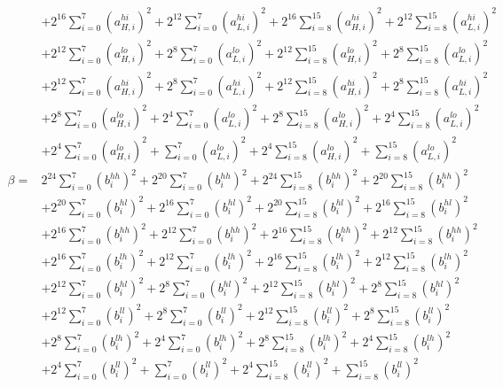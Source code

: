 \documentclass[fleqn]{article}
\begin{document}
{\[{\begin{aligned}
  & + 2^{16}\sum_{i=0}^{7}(a_{H,i}^{hi})^2 + 2^{12}\sum_{i=0}^{7}(a_{L,i}^{hi})^2 + 2^{16}\sum_{i=8}^{15}(a_{H,i}^{hi})^2 + 2^{12}\sum_{i=8}^{15}(a_{L,i}^{hi})^2 \\
  & + 2^{12}\sum_{i=0}^{7}(a_{H,i}^{lo})^2 + 2^{8}\sum_{i=0}^{7}(a_{L,i}^{lo})^2 + 2^{12}\sum_{i=8}^{15}(a_{H,i}^{lo})^2 + 2^{8}\sum_{i=8}^{15}(a_{L,i}^{lo})^2 \\
  & + 2^{12}\sum_{i=0}^{7}(a_{H,i}^{hi})^2 + 2^{8}\sum_{i=0}^{7}(a_{L,i}^{hi})^2 + 2^{12}\sum_{i=8}^{15}(a_{H,i}^{hi})^2 + 2^{8}\sum_{i=8}^{15}(a_{L,i}^{hi})^2 \\
  & + 2^{8}\sum_{i=0}^{7}(a_{H,i}^{lo})^2 + 2^{4}\sum_{i=0}^{7}(a_{L,i}^{lo})^2 + 2^{8}\sum_{i=8}^{15}(a_{H,i}^{lo})^2 + 2^{4}\sum_{i=8}^{15}(a_{L,i}^{lo})^2 \\
  & + 2^{4}\sum_{i=0}^{7}(a_{H,i}^{lo})^2 + \sum_{i=0}^{7}(a_{L,i}^{lo})^2 + 2^{4}\sum_{i=8}^{15}(a_{H,i}^{lo})^2 + \sum_{i=8}^{15}(a_{L,i}^{lo})^2 \\[0.3em]
\beta ={}& 2^{24}\sum_{i=0}^{7}(b_i^{hh})^2 + 2^{20}\sum_{i=0}^{7}(b_i^{hh})^2 + 2^{24}\sum_{i=8}^{15}(b_i^{hh})^2 + 2^{20}\sum_{i=8}^{15}(b_i^{hh})^2 \\
  & + 2^{20}\sum_{i=0}^{7}(b_i^{hl})^2 + 2^{16}\sum_{i=0}^{7}(b_i^{hl})^2 + 2^{20}\sum_{i=8}^{15}(b_i^{hl})^2 + 2^{16}\sum_{i=8}^{15}(b_i^{hl})^2 \\
  & + 2^{16}\sum_{i=0}^{7}(b_i^{hh})^2 + 2^{12}\sum_{i=0}^{7}(b_i^{hh})^2 + 2^{16}\sum_{i=8}^{15}(b_i^{hh})^2 + 2^{12}\sum_{i=8}^{15}(b_i^{hh})^2 \\
  & + 2^{16}\sum_{i=0}^{7}(b_i^{lh})^2 + 2^{12}\sum_{i=0}^{7}(b_i^{lh})^2 + 2^{16}\sum_{i=8}^{15}(b_i^{lh})^2 + 2^{12}\sum_{i=8}^{15}(b_i^{lh})^2 \\
  & + 2^{12}\sum_{i=0}^{7}(b_i^{hl})^2 + 2^{8}\sum_{i=0}^{7}(b_i^{hl})^2 + 2^{12}\sum_{i=8}^{15}(b_i^{hl})^2 + 2^{8}\sum_{i=8}^{15}(b_i^{hl})^2 \\
  & + 2^{12}\sum_{i=0}^{7}(b_i^{ll})^2 + 2^{8}\sum_{i=0}^{7}(b_i^{ll})^2 + 2^{12}\sum_{i=8}^{15}(b_i^{ll})^2 + 2^{8}\sum_{i=8}^{15}(b_i^{ll})^2 \\
  & + 2^{8}\sum_{i=0}^{7}(b_i^{lh})^2 + 2^{4}\sum_{i=0}^{7}(b_i^{lh})^2 + 2^{8}\sum_{i=8}^{15}(b_i^{lh})^2 + 2^{4}\sum_{i=8}^{15}(b_i^{lh})^2 \\
  & + 2^{4}\sum_{i=0}^{7}(b_i^{ll})^2 + \sum_{i=0}^{7}(b_i^{ll})^2 + 2^{4}\sum_{i=8}^{15}(b_i^{ll})^2 + \sum_{i=8}^{15}(b_i^{ll})^2
\end{aligned}
\;}
\]
}
\end{document}
